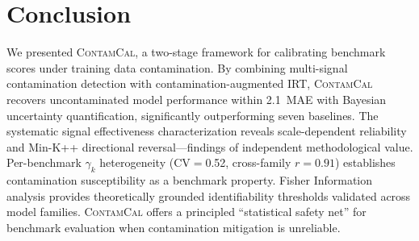 \documentclass[11pt,a4paper]{article}
\newcommand{\contcal}{\textsc{ContamCal}}
\newcommand{\pp}{\,\text{pp}}
\begin{document}
\section{Conclusion}

We presented \contcal{}, a two-stage framework for calibrating benchmark scores under training data contamination.
By combining multi-signal contamination detection with contamination-augmented IRT, \contcal{} recovers uncontaminated model performance within 2.1\pp{} MAE with Bayesian uncertainty quantification, significantly outperforming seven baselines.
The systematic signal effectiveness characterization reveals scale-dependent reliability and Min-K++ directional reversal---findings of independent methodological value.
Per-benchmark $\gamma_k$ heterogeneity (CV$=$0.52, cross-family $r=0.91$) establishes contamination susceptibility as a benchmark property.
Fisher Information analysis provides theoretically grounded identifiability thresholds validated across model families.
\contcal{} offers a principled ``statistical safety net'' for benchmark evaluation when contamination mitigation is unreliable.
\end{document}
